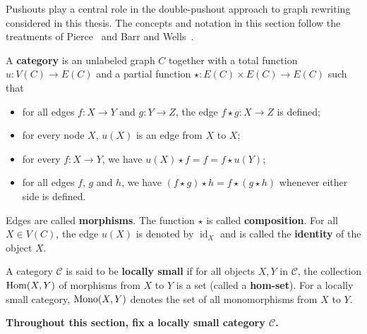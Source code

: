 Pushouts play a central role in the double-pushout approach to graph rewriting considered in this thesis. The concepts and notation in this section follow the treatments of Pierce~\cite{pierce1991basic} and Barr and Wells~\cite{barr1990category}.
\begin{definition}
    \label{def:cat}
    A \textbf{category} is an unlabeled graph \( C \) together with a total function \( u : V(C)  \mathop{\to} E(C) \) and a partial function \( \star: E(C) \mathop{\times} E(C)  \mathop{\to} E(C) \) such that 
        \begin{itemize}
            \item for all edges \( f:X  \mathop{\to} Y \) and \( g:Y  \mathop{\to} Z \), the edge \( f \mathop{\star} g :X  \mathop{\to} Z \) is defined; 
            \item  for every node \( X \), \( u(X) \) is an edge from \( X \) to \( X \); 
            \item for every \( f:X  \mathop{\to} Y \), we have \(u(X) \mathop{\star} f \mathop{=} f \mathop{=} f \mathop{\star} u(Y)\);
            \item for all edges \( f \), \( g \) and \(h\), we have \( (f \mathop{\star} g) \mathop{\star} h \mathop{=} f \mathop{\star} (g \mathop{\star} h) \) whenever either side is defined.
        \end{itemize}
    Edges are called \textbf{morphisms}. The function $\star$ is called \textbf{composition}. For all \( X \mathop{\in} V(C) \), the edge \( u(X) \) is denoted by \( \operatorname{id}_X \) and is called the \textbf{identity} of the object \( X \).
\end{definition}    
\begin{definition}
    A category \(\mathcal{C}\) is said to be \textbf{locally small} if for all objects \(X,Y\) in \(\mathcal{C}\), the collection $\operatorname{Hom}(X,Y)$ of morphisms from \(X\) to \(Y\) is a set (called a \textbf{hom-set}). For a locally small category, $\operatorname{Mono}(X,Y)$ denotes the set of all monomorphisms from $X$ to $Y$.
\end{definition}
\textbf{Throughout this section, fix a locally small category \( \mathcal{C} \).}
